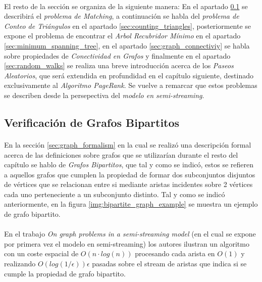 \documentclass{subfiles}
\begin{document}
      \paragraph{}
      El resto de la sección se organiza de la siguiente manera: En el apartado \ref{sec:bipartite_matchings} se describirá el \emph{problema de Matching}, a continuación se habla del \emph{problema de Conteo de Triángulos} en el apartado \ref{sec:counting_triangles}, posteriormente se expone el problema de encontrar el \emph{Arbol Recubridor Mínimo} en el apartado \ref{sec:minimum_spanning_tree}, en el apartado \ref{sec:graph_connectiviy} se habla sobre propiedades de \emph{Conectividad en Grafos} y finalmente en el apartado \ref{sec:random_walks} se realiza una breve introducción acerca de los \emph{Paseos Aleatorios}, que será extendida en profundidad en el capítulo siguiente, destinado exclusivamente al \emph{Algoritmo PageRank}. Se vuelve a remarcar que estos problemas se describen desde la persepectiva del \emph{modelo en semi-streaming}.

      \subsection{Verificación de Grafos Bipartitos}
      \label{sec:bipartite_matchings}

        \paragraph{}
        En la sección \ref{sec:graph_formalism} en la cual se realizó una descripción formal acerca de las definiciones sobre grafos que se utilizarían durante el resto del capítulo se hablo de \emph{Grafos Bipartitos}, que tal y como se indicó, estos se refieren a aquellos grafos que cumplen la propiedad de formar dos subconjuntos disjuntos de vértices que se relacionan entre si mediante aristas incidentes sobre 2 vértices cada uno perteneciente a un subconjunto distinto. Tal y como se indicó anteriormente, en la figura \ref{img:bipartite_graph_example} se muestra un ejemplo de grafo bipartito.

        \paragraph{}
        En el trabajo \emph{On graph problems in a semi-streaming model}\cite{feigenbaum2005graph} (en el cual se expone por primera vez el modelo en semi-streaming) los autores ilustran un algoritmo con un coste espacial de $O(n \cdot log(n))$ procesando cada arista en $O(1)$ y realizando $O(log(1 / \epsilon)) \epsilon$ pasadas sobre el stream de aristas que indica si se cumple la propiedad de grafo bipartito.
\end{document}
